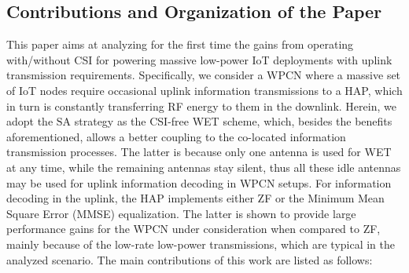 \documentclass[10pt,journal,a4paper]{IEEEtran}
\begin{document}
	\subsection{Contributions and Organization of the Paper}\label{contributions}	
	This paper aims at analyzing for the first time the gains from operating with/without CSI for powering massive low-power IoT deployments with uplink transmission requirements. Specifically, we consider a WPCN where a massive set of IoT nodes require occasional uplink information transmissions to a HAP, which in turn is constantly transferring RF energy to them in the downlink.
	Herein, we adopt the $\mathrm{SA}$ strategy \cite{Lopez.2019_CSI,Lopez.2020} as the CSI-free WET scheme, which, besides the benefits aforementioned, allows a better coupling to the co-located information transmission processes. The latter is because   only one antenna is used for WET at any time, while the remaining antennas stay silent, thus all these idle antennas may be used for uplink information decoding in WPCN setups. For information decoding in the uplink, the HAP implements either ZF or the Minimum Mean Square Error (MMSE) equalization. The latter is shown to provide large performance gains for the WPCN under consideration when compared to ZF, mainly because of the low-rate low-power transmissions, which are typical in the analyzed scenario.
	The
	main contributions of this work are listed as follows:
\end{document}
